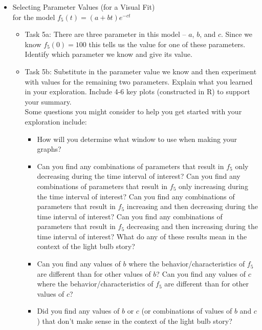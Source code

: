 \documentclass{article}
\theoremstyle{plain}
\theoremstyle{box}
\begin{document}
\begin{itemize}
\begin{itemize}
	\item Task 4c: Create plots with both the data (the histogram) and a selected model (normal distribution with the parameter values you picked). Include your best visual fit and one poor visual fit. Make sure you clearly indicate which parameter values you used in each case.
	\item Task 4d: Explain what your best visual fit parameters mean in the context of the light bulb question.
	\end{itemize}
\item Selecting Parameter Values (for a Visual Fit) \\ for the model $f_5(t) = (a + bt)e^{-ct}$
	\begin{itemize}
	\item Task 5a: There are three parameter in this model -- $a$, $b$, and $c$. Since we know $f_5(0) = 100$ this tells us the value for one of these parameters. Identify which parameter we know and give its value.
	\item Task 5b: Substitute in the parameter value we know and then experiment with values for the remaining two parameters. Explain what you learned in your exploration. Include 4-6 key plots (constructed in R) to support your summary. \\
	Some questions you might consider to help you get started with your exploration include:
		\begin{itemize}
		\item How will you determine what window to use when making your graphs?
		\item Can you find any combinations of parameters that result in $f_5$ only decreasing during the time interval of interest? Can you find any combinations of parameters that result in $f_5$ only increasing during the time interval of interest? Can you find any combinations of parameters that result in $f_5$ increasing and then decreasing during the time interval of interest? Can you find any combinations of parameters that result in $f_5$ decreasing and then increasing during the time interval of interest? What do any of these results mean in the context of the light bulb story?
		\item Can you find any values of $b$ where the behavior/characteristics of $f_5$ are different than for other values of $b$? Can you find any values of $c$ where the behavior/characteristics of $f_5$ are different than for other values of $c$?
		\item Did you find any values of $b$ or $c$ (or combinations of values of $b$ and $c$) that don't make sense in the context of the light bulb story?

\end{itemize}
\end{itemize}
\end{itemize}
\end{document}
